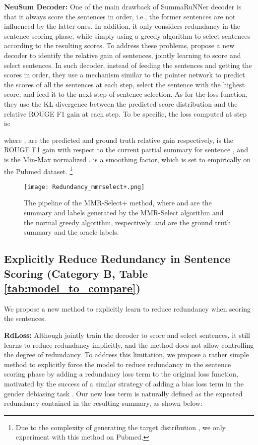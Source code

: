 \documentclass[11pt,a4paper]{article}
\begin{document}
\textbf{NeuSum Decoder:} 
One of the main drawback of SummaRuNNer decoder is that it always score the sentences in order, i.e., the former sentences are not influenced by the latter ones. In addition, it only considers redundancy in the sentence scoring phase, while simply using a greedy algorithm to select sentences according to the resulting scores. To address these problems,  propose a new decoder to identify the relative gain of sentences, jointly learning to score and select sentences. In such decoder, instead of feeding the sentences and getting the scores in order, they use a mechanism similar to the pointer network \cite{pointer_network} to 
predict the scores of all the sentences at each step, select the sentence with the highest score, and feed it to the next step of sentence selection. As for the loss function, they use the KL divergence between the predicted score distribution and the relative ROUGE F1 gain at each step. 
To be specific, the loss computed at step  is: \vspace{-2mm}

where ,  are the predicted and ground truth relative gain respectively,  is the ROUGE F1 gain with respect to the current partial summary  for sentence , and  is the Min-Max normalized .  is a smoothing factor, which is set to  empirically on the Pubmed dataset. \footnote{Due to the complexity of generating the target distribution , we only experiment with this method on Pubmed.}

\begin{figure*}[h!]
    \centering
    \texttt{[image: Redundancy\_mmrselect+.png]}
    \caption{The pipeline of the MMR-Select+ method, where  and   are the summary and labels generated by the MMR-Select algorithm and the normal greedy algorithm, respectively.  and  are the ground truth summary and the oracle labels.}
    \label{fig:mmr-rl}
    \vspace{-2mm}
\end{figure*}
\vspace{-1mm}
\subsection{Explicitly Reduce Redundancy in Sentence Scoring (Category B, Table \ref{tab:model_to_compare})}
We propose a new method to explicitly learn to reduce redundancy when scoring the sentences.

\textbf{RdLoss:}
Although  jointly train the decoder to score and select sentences, it still learns to reduce redundancy implicitly, and the method does not allow controlling the degree of redundancy. To address this limitation, we propose a rather simple method to explicitly force the model to reduce redundancy in the sentence scoring phase by adding 
a redundancy loss term
to the original loss function, motivated by the success of a similar strategy of adding a bias loss term in the gender debiasing task \cite{qian-etal-2019-reducing}. Our new loss term  is naturally defined as the expected redundancy contained in the resulting summary, as shown below:
\vspace{-2mm}
\end{document}
